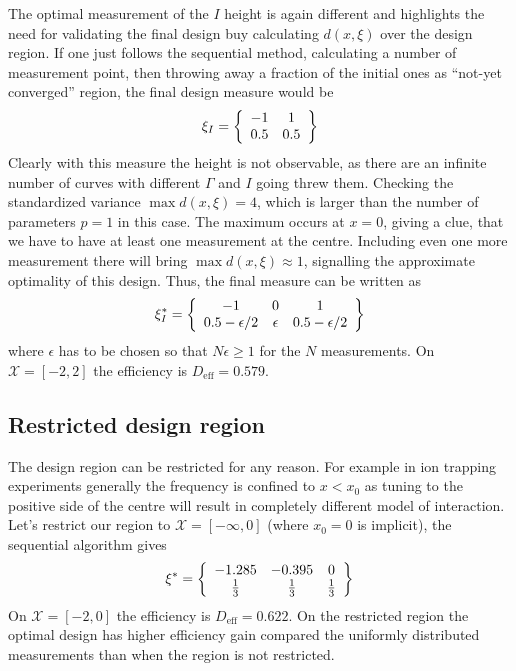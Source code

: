 \documentclass[12pt]{iopart}
\begin{document}
The optimal measurement of the $I$ height is again different and highlights the need for validating the final design buy calculating $d(x, \xi)$ over the design region. If one just follows the sequential method, calculating a number of measurement point, then throwing away a fraction of the initial ones as ``not-yet converged'' region, the final design measure would be
\begin{equation}
\xi_{I} = \left\{
  \begin{array}{c c}
    -1 &  1 \\
    0.5 & 0.5\\
  \end{array} \right \}
\end{equation}
Clearly with this measure the height is not observable, as there are an infinite number of curves with different $\Gamma$ and $I$ going threw them. Checking the standardized variance $\max d(x, \xi) = 4$, which is larger than the number of parameters $p = 1$ in this case. The maximum occurs at $x = 0$, giving a clue, that we have to have at least one measurement at the centre. Including even one more measurement there will bring $\max d(x, \xi) \approx 1$, signalling the approximate optimality of this design. Thus, the final measure can be written as
\begin{equation}
\xi^*_{I} = \left\{
  \begin{array}{c c c}
    -1 & 0 &  1 \\
    0.5-\epsilon/2 & \epsilon & 0.5-\epsilon/2\\
  \end{array} \right \}
\end{equation}
where $\epsilon$ has to be chosen so that $N \epsilon \geq 1$ for the $N$ measurements. On $\mathcal{X} = [-2,2]$ the efficiency is $D_\mathrm{eff} = 0.579$.

\subsection{Restricted design region}

The design region can be restricted for any reason. For example in ion trapping experiments generally the frequency is confined to $x < x_0$ as tuning to the positive side of the centre will result in completely different model of interaction. Let's restrict our region to $\mathcal{X} = [-\infty, 0]$ (where $x_0 = 0$ is implicit), the sequential algorithm gives
\begin{equation}
\xi^* = \left\{
  \begin{array}{c c c}
    -1.285 & -0.395 &  0 \\
     \frac{1}{3} & \frac{1}{3} & \frac{1}{3}\\
  \end{array} \right \}
\end{equation}
On $\mathcal{X} = [-2,0]$ the efficiency is $D_\mathrm{eff} = 0.622$. On the restricted region the optimal design has higher efficiency gain compared the uniformly distributed measurements than when the region is not restricted.
\end{document}
